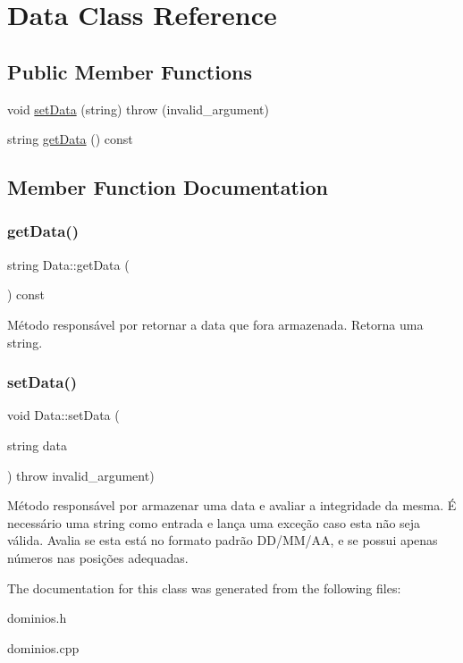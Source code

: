 \hypertarget{classData}{}\section{Data Class Reference}
\label{classData}
\subsection*{Public Member Functions}
\begin{DoxyCompactItemize}
\item 
void \hyperlink{classData_a75a50f88bc966f20826a3959717a5acc}{set\+Data} (string)  throw (invalid\+\_\+argument)
\item 
string \hyperlink{classData_a13f25eafdc138d743e99eb4086d765a2}{get\+Data} () const
\end{DoxyCompactItemize}


\subsection{Member Function Documentation}
\mbox{\label{classData_a13f25eafdc138d743e99eb4086d765a2}} 
\subsubsection{\texorpdfstring{get\+Data()}{getData()}}
{\footnotesize\ttfamily string Data\+::get\+Data (\begin{DoxyParamCaption}{ }\end{DoxyParamCaption}) const\hspace{0.3cm}{\ttfamily [inline]}}

Método responsável por retornar a data que fora armazenada. Retorna uma string. \mbox{\label{classData_a75a50f88bc966f20826a3959717a5acc}} 
\subsubsection{\texorpdfstring{set\+Data()}{setData()}}
{\footnotesize\ttfamily void Data\+::set\+Data (\begin{DoxyParamCaption}\item[{string}]{data }\end{DoxyParamCaption}) throw  invalid\+\_\+argument) }

Método responsável por armazenar uma data e avaliar a integridade da mesma. É necessário uma string como entrada e lança uma exceção caso esta não seja válida. Avalia se esta está no formato padrão D\+D/\+M\+M/\+AA, e se possui apenas números nas posições adequadas. 

The documentation for this class was generated from the following files\+:\begin{DoxyCompactItemize}
\item 
dominios.\+h\item 
dominios.\+cpp\end{DoxyCompactItemize}
